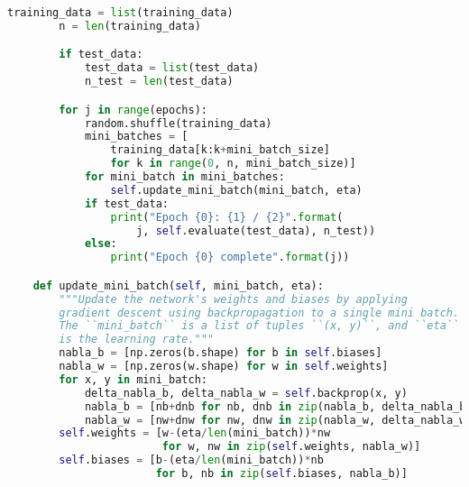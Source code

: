 \begin{fullwidth}
\begin{lstlisting}[caption={network.py (Python 3.7.1)},label={lst:network.py}, language=Python]
        training_data = list(training_data)
        n = len(training_data)

        if test_data:
            test_data = list(test_data)
            n_test = len(test_data)

        for j in range(epochs):
            random.shuffle(training_data)
            mini_batches = [
                training_data[k:k+mini_batch_size]
                for k in range(0, n, mini_batch_size)]
            for mini_batch in mini_batches:
                self.update_mini_batch(mini_batch, eta)
            if test_data:
                print("Epoch {0}: {1} / {2}".format(
                    j, self.evaluate(test_data), n_test))
            else:
                print("Epoch {0} complete".format(j))

    def update_mini_batch(self, mini_batch, eta):
        """Update the network's weights and biases by applying
        gradient descent using backpropagation to a single mini batch.
        The ``mini_batch`` is a list of tuples ``(x, y)``, and ``eta``
        is the learning rate."""
        nabla_b = [np.zeros(b.shape) for b in self.biases]
        nabla_w = [np.zeros(w.shape) for w in self.weights]
        for x, y in mini_batch:
            delta_nabla_b, delta_nabla_w = self.backprop(x, y)
            nabla_b = [nb+dnb for nb, dnb in zip(nabla_b, delta_nabla_b)]
            nabla_w = [nw+dnw for nw, dnw in zip(nabla_w, delta_nabla_w)]
        self.weights = [w-(eta/len(mini_batch))*nw
                        for w, nw in zip(self.weights, nabla_w)]
        self.biases = [b-(eta/len(mini_batch))*nb
                       for b, nb in zip(self.biases, nabla_b)]


\end{lstlisting}
\end{fullwidth}
